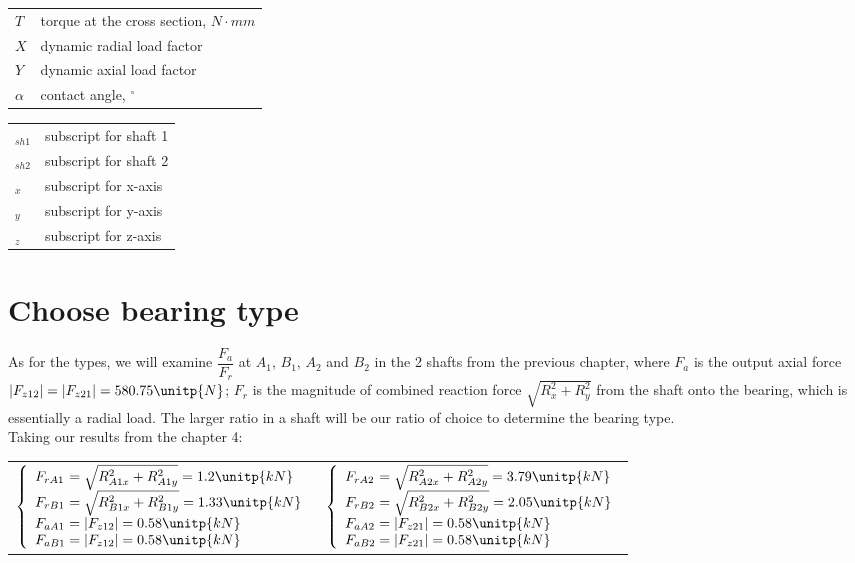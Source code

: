 \begin{tabular}[t]{lp{6.5cm}}
	$ T $ & torque at the cross section, $ \unit{N\cdot mm} $\\
	$ X $ & dynamic radial load factor\\
	$ Y $ & dynamic axial load factor\\
	$ \alpha $ & contact angle, $ ^\circ $\\
	
\end{tabular}
\begin{tabular}[t]{lp{6.5cm}}
	$ _{sh1} $ & subscript for shaft 1\\
	$ _{sh2} $ & subscript for shaft 2\\
	$ _x $ & subscript for x-axis\\
	$ _y $ & subscript for y-axis\\
	$ _z $ & subscript for z-axis\\
\end{tabular}

\section{Choose bearing type}
As for the types, we will examine $  \dfrac{F_a}{F_r}  $ at $ A_1 $, $ B_1 $, $ A_2 $ and $ B_2 $ in the 2 shafts from the previous chapter, where $ F_a $ is the output axial force $ |F_{z12}| = |F_{z21}| = 580.75 \unitp{N} $; $ F_r $ is the magnitude of combined reaction force $ \sqrt{R_x^2+R_y^2} $ from the shaft onto the bearing, which is essentially a radial load. The larger ratio in a shaft will be our ratio of choice to determine the bearing type.\\
Taking our results from the chapter 4: \vskip2mm
{\centering
	\begin{tabular}[ht]{p{7.5cm}p{7.5cm}}
		$
		\left\{ 
		\begin{array}{l@{{} = {}}l}
		F_{rA1} & \sqrt{R_{A1x}^2+R_{A1y}^2}  =  1.2\unitp{kN}\\
		F_{rB1} & \sqrt{R_{B1x}^2+R_{B1y}^2}  =  1.33\unitp{kN}\\
		F_{aA1} & |F_{z12}|  =  0.58 \unitp{kN}\\
		F_{aB1} & |F_{z12}|  =  0.58 \unitp{kN}\\
		\end{array}
		\right.
		$ & $
		\left\{ 
		\begin{array}{l@{{} = {}}l}
		F_{rA2} & \sqrt{R_{A2x}^2+R_{A2y}^2}  =  3.79\unitp{kN}\\
		F_{rB2} & \sqrt{R_{B2x}^2+R_{B2y}^2}  =  2.05\unitp{kN}\\
		F_{aA2} & |F_{z21}|  =  0.58 \unitp{kN}\\
		F_{aB2} & |F_{z21}|  =  0.58 \unitp{kN}\\
		\end{array}
		\right.
		$
\end{tabular}}\vskip2mm


